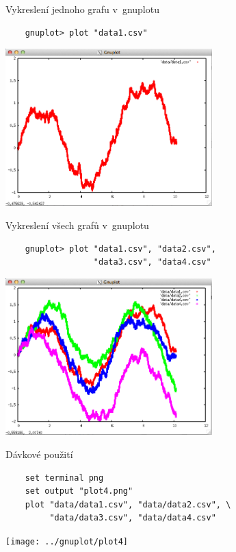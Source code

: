 \documentclass{beamer}
\begin{document}
\begin{frame}[fragile]{Vykreslení jednoho grafu v~gnuplotu}
  \begin{verbatim}
    gnuplot> plot "data1.csv"
  \end{verbatim}
  \pause
  \begin{center}
    \includegraphics[width=0.6\textwidth]{gnuplot_interactive}
  \end{center}
\end{frame}

\begin{frame}[fragile]{Vykreslení všech grafů v~gnuplotu}
  \begin{verbatim}
    gnuplot> plot "data1.csv", "data2.csv",
                  "data3.csv", "data4.csv"
  \end{verbatim}
  \pause
  \begin{center}
    \includegraphics[width=0.6\textwidth]{gnuplot_interactive_all}
  \end{center}
\end{frame}

\begin{frame}[fragile]{Dávkové použití}
  \scriptsize
  \begin{verbatim}
    set terminal png
    set output "plot4.png"
    plot "data/data1.csv", "data/data2.csv", \
         "data/data3.csv", "data/data4.csv"
  \end{verbatim}
  \pause
  \begin{center}
    \texttt{[image: ../gnuplot/plot4]}
  \end{center}
\end{frame}
\end{document}
